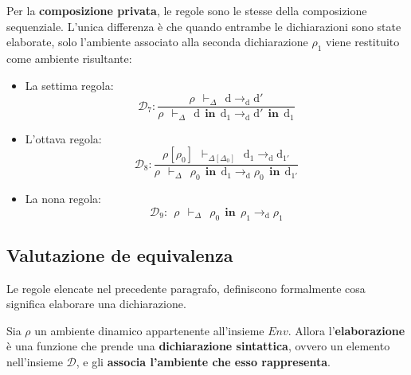 \documentclass[a4paper]{article}
\begin{document}
	\noindent
	Per la \textbf{composizione privata}, le regole sono le stesse della composizione sequenziale. L'unica differenza è che quando entrambe le dichiarazioni sono state elaborate, solo l'ambiente associato alla seconda dichiarazione $\rho_{1}$ viene restituito come ambiente risultante:
	\begin{itemize}
		\item La settima regola:
		\begin{equation*}
			\mathcal{D}_{7} : \dfrac{
				\rho \:\: \vdash_{\Delta} \:\: \mathrm{d} \rightarrow_{\mathrm{d}} \mathrm{d}'
			}{
				\rho \:\: \vdash_{\Delta} \:\: \mathrm{d} \:\: \mathbf{in} \:\: \mathrm{d}_{1} \rightarrow_{\mathrm{d}} \mathrm{d}' \:\: \mathbf{in} \:\: \mathrm{d}_{1}
			}
		\end{equation*}
		
		\item L'ottava regola:
		\begin{equation*}
			\mathcal{D}_{8} : \dfrac{
				\rho\left[\rho_{0}\right] \:\: \vdash_{\Delta\left[\Delta_{0}\right]} \:\: \mathrm{d}_{1} \rightarrow_{\mathrm{d}} \mathrm{d}_{1'}
			}{
				\rho \:\: \vdash_{\Delta} \:\: \rho_{0} \:\: \mathbf{in} \:\: \mathrm{d}_{1} \rightarrow_{\mathrm{d}} \rho_{0} \:\: \mathbf{in} \:\: \mathrm{d}_{1'}
			}
		\end{equation*}
		
		\item La nona regola:
		\begin{equation*}
			\mathcal{D}_{9} : \:\: \rho \:\: \vdash_{\Delta} \:\: \rho_{0} \:\: \mathbf{in} \:\: \rho_{1} \rightarrow_{\mathrm{d}} \rho_{1}
		\end{equation*}
	\end{itemize}\newpage
	
	\subsection{Valutazione de equivalenza}
	
	Le regole elencate nel precedente paragrafo, definiscono formalmente cosa significa elaborare una dichiarazione.\newline
	
	\noindent
	Sia $\rho$ un ambiente dinamico appartenente all'insieme $Env$. Allora l'\textbf{elaborazione} è una funzione che prende una \textbf{dichiarazione sintattica}, ovvero un elemento nell'insieme $\mathcal{D}$, e gli \textbf{associa l'ambiente che esso rappresenta}.
	
\end{document}
